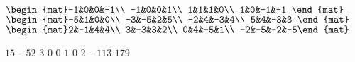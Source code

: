 \begin{Exercise}[
name={},
title={}, 
difficulty=0,
origin={\cite{GH}}]
\begin{multicols}{2}
\Question $\begin{mat}-1&0&0&-1\\  -1&0&0&1\\  1&1&1&0\\  1&0&-1&-1 \end{mat}$
\Question $\begin{mat}-5&1&0&0\\  -3&-5&2&5\\  -2&4&-3&4\\  5&4&-3&3 \end{mat}$
\Question $\begin{mat}2&-1&4&4\\  3&-3&3&2\\  0&4&-5&1\\  -2&-5&-2&-5\end{mat}$
\EndCurrentQuestion
\end{multicols}

\end{Exercise}
\begin{Answer}
\Question $ 15 $
\Question $ -52 $
\Question $ 3 $
\Question $ 0 $
\Question $ 0 $
\Question $ 1 $
\Question $ 0 $
\Question $ 2 $
\Question $ -113 $
\Question $ 179$
\end{Answer}
